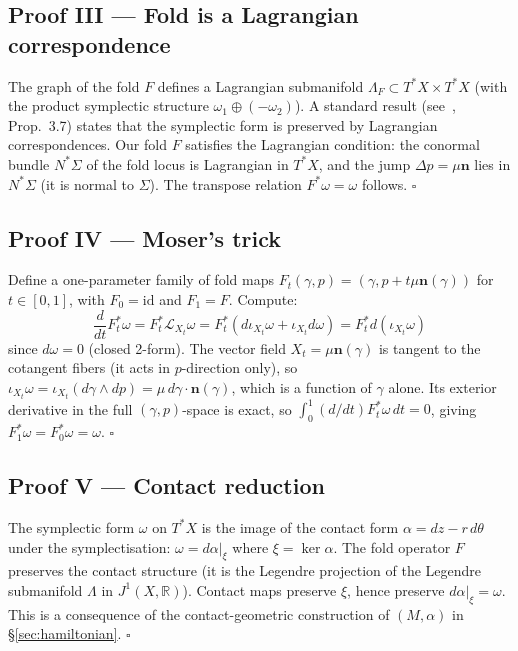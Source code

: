 \documentclass[14pt,a4paper]{extarticle}
\begin{document}
\subsection*{Proof III\; — Fold is a Lagrangian correspondence}

The graph of the fold $F$ defines a Lagrangian submanifold
$\Lambda_F \subset T^*X \times T^*X$ (with the product symplectic
structure $\omega_1 \oplus (-\omega_2)$).
A standard result (see~\cite{McDuffSalamon2017}, Prop.~3.7)
states that the symplectic form is preserved by Lagrangian
correspondences.
Our fold $F$ satisfies the Lagrangian condition:
the conormal bundle $N^*\Sigma$ of the fold locus
is Lagrangian in $T^*X$, and the jump $\Delta p = \mu\mathbf{n}$
lies in $N^*\Sigma$ (it is normal to $\Sigma$).
The transpose relation $F^*\omega = \omega$ follows.  \hfill $\square$

\subsection*{Proof IV\; — Moser's trick}

Define a one-parameter family of fold maps
$F_t(\gamma, p) = (\gamma, p + t\mu\mathbf{n}(\gamma))$ for $t \in [0,1]$,
with $F_0 = \mathrm{id}$ and $F_1 = F$.
Compute:
\[
  \frac{d}{dt} F_t^*\omega
  = F_t^* \mathcal{L}_{X_t} \omega
  = F_t^*(d\iota_{X_t}\omega + \iota_{X_t}d\omega)
  = F_t^* d(\iota_{X_t}\omega)
\]
since $d\omega = 0$ (closed 2-form).
The vector field $X_t = \mu\mathbf{n}(\gamma)$ is tangent to the
cotangent fibers (it acts in $p$-direction only), so
$\iota_{X_t}\omega = \iota_{X_t}(d\gamma \wedge dp) = \mu\,d\gamma \cdot \mathbf{n}(\gamma)$,
which is a function of $\gamma$ alone.
Its exterior derivative in the full $(\gamma, p)$-space is exact,
so $\int_0^1 (d/dt) F_t^*\omega\,dt = 0$,
giving $F_1^*\omega = F_0^*\omega = \omega$.  \hfill $\square$

\subsection*{Proof V\; — Contact reduction}

The symplectic form $\omega$ on $T^*X$ is the image of the contact
form $\alpha = dz - r\,d\theta$ under the symplectisation:
$\omega = d\alpha|_{\xi}$ where $\xi = \ker\alpha$.
The fold operator $F$ preserves the contact structure (it is the
Legendre projection of the Legendre submanifold $\Lambda$ in $J^1(X,\mathbb{R})$).
Contact maps preserve $\xi$, hence preserve $d\alpha|_\xi = \omega$.
This is a consequence of the contact-geometric construction of
$(M, \alpha)$ in \S\ref{sec:hamiltonian}.  \hfill $\square$
\end{document}
